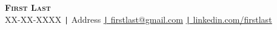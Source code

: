 \begin{center}
    \textbf{\Huge \scshape First Last} \\ \vspace{5pt}
    \small XX-XX-XXXX \quad
    {\texttt{|} \quad Address} \quad
    \href{mailto:firstlast@gmail.com}{\texttt{|} \quad \underline{firstlast@gmail.com}} \quad
    \href{https://www.linkedin.com/in/}{\texttt{|} \quad \underline{linkedin.com/firstlast}} 
\end{center}